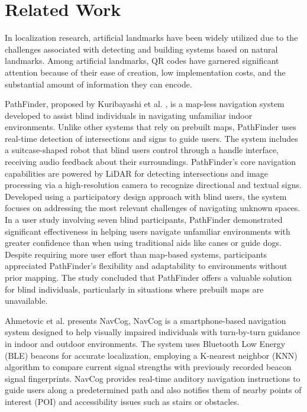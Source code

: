 \section{Related Work}

In localization research, artificial landmarks have been widely utilized due to the challenges associated with detecting and building systems based on natural landmarks. Among artificial landmarks, QR codes have garnered significant attention because of their ease of creation, low implementation costs, and the substantial amount of information they can encode.

PathFinder, proposed by Kuribayashi et al. \cite{kuribayashi2023}, is a map-less navigation system developed to assist blind individuals in navigating unfamiliar indoor environments. Unlike other systems that rely on prebuilt maps, PathFinder uses real-time detection of intersections and signs to guide users. The system includes a suitcase-shaped robot that blind users control through a handle interface, receiving audio feedback about their surroundings. PathFinder’s core navigation capabilities are powered by LiDAR for detecting intersections and image processing via a high-resolution camera to recognize directional and textual signs. Developed using a participatory design approach with blind users, the system focuses on addressing the most relevant challenges of navigating unknown spaces. In a user study involving seven blind participants, PathFinder demonstrated significant effectiveness in helping users navigate unfamiliar environments with greater confidence than when using traditional aids like canes or guide dogs. Despite requiring more user effort than map-based systems, participants appreciated PathFinder’s flexibility and adaptability to environments without prior mapping. The study concluded that PathFinder offers a valuable solution for blind individuals, particularly in situations where prebuilt maps are unavailable.

Ahmetovic et al. \cite{ahmetovic2016} presents NavCog, NavCog is a smartphone-based navigation system designed to help visually impaired individuals with turn-by-turn guidance in indoor and outdoor environments. The system uses Bluetooth Low Energy (BLE) beacons for accurate localization, employing a K-nearest neighbor (KNN) algorithm to compare current signal strengths with previously recorded beacon signal fingerprints. NavCog provides real-time auditory navigation instructions to guide users along a predetermined path and also notifies them of nearby points of interest (POI) and accessibility issues such as stairs or obstacles.

